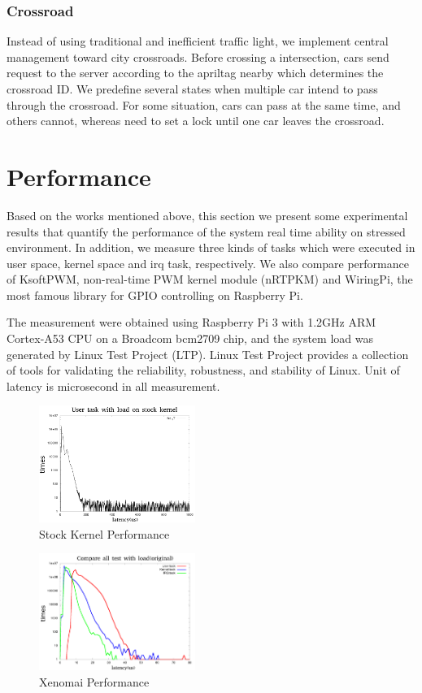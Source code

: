 \documentclass[conference]{IEEEtran}
\begin{document}
\subsubsection{Crossroad}

Instead of using traditional and inefficient traffic light, we implement central management toward city crossroads. Before crossing a intersection, cars send request to the server according to the apriltag nearby which determines the crossroad ID. We predefine several states when multiple car intend to pass through the crossroad. For some situation, cars can pass at the same time, and others cannot, whereas need to set a lock until one car leaves 	the crossroad.

\section{Performance}

Based on the works mentioned above, this section we present some experimental results that quantify the performance of the system real time ability on stressed environment. In addition, we measure three kinds of tasks which were executed in user space, kernel space and irq task, respectively. We also compare performance of KsoftPWM, non-real-time PWM kernel module (nRTPKM) and WiringPi, the most famous library for GPIO controlling on Raspberry Pi.

	The measurement were obtained using Raspberry Pi 3 with 1.2GHz ARM Cortex-A53 CPU on a Broadcom bcm2709 chip, and the system load was generated by Linux Test Project (LTP). Linux Test Project provides a collection of tools for validating the reliability, robustness, and stability of Linux. Unit of latency is microsecond in all measurement.

\FloatBarrier
\begin{figure}	
	\centering
	\includegraphics[width=2in]{img/stock_kernel.png}
	\caption{Stock Kernel Performance}
	\label{fig:stock_kernel_perf}
\end{figure}

\begin{figure}	
	\centering
	\includegraphics[width=2in]{img/xenomai_load.png}
	\caption{Xenomai Performance}
	\label{fig:xeno_perf}
\end{figure}
\end{document}
